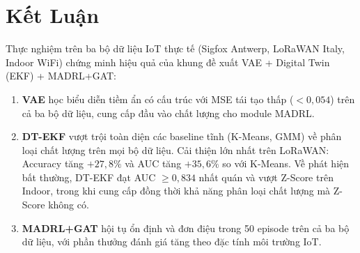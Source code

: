 \documentclass[12pt,a4paper]{article}
\begin{document}
\section{Kết Luận}

Thực nghiệm trên ba bộ dữ liệu IoT thực tế (Sigfox Antwerp, LoRaWAN Italy,
Indoor WiFi) chứng minh hiệu quả của khung đề xuất VAE + Digital Twin (EKF)
+ MADRL+GAT:

\begin{enumerate}
    \item \textbf{VAE} học biểu diễn tiềm ẩn có cấu trúc với MSE tái tạo
    thấp ($< 0{,}054$) trên cả ba bộ dữ liệu, cung cấp đầu vào chất lượng
    cho module MADRL.

    \item \textbf{DT-EKF} vượt trội toàn diện các baseline tĩnh (K-Means,
    GMM) về phân loại chất lượng trên mọi bộ dữ liệu. Cải thiện lớn nhất
    trên LoRaWAN: Accuracy tăng $+27{,}8\%$ và AUC tăng $+35{,}6\%$ so với
    K-Means. Về phát hiện bất thường, DT-EKF đạt AUC $\geq 0{,}834$ nhất
    quán và vượt Z-Score trên Indoor, trong khi cung cấp đồng thời khả năng
    phân loại chất lượng mà Z-Score không có.

    \item \textbf{MADRL+GAT} hội tụ ổn định và đơn điệu trong 50 episode
    trên cả ba bộ dữ liệu, với phần thưởng đánh giá tăng theo đặc tính
    môi trường IoT.
\end{enumerate}
\end{document}
